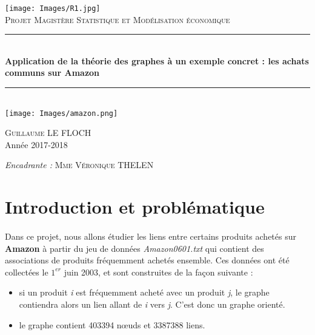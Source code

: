 \documentclass[14pt, openany]{article}
\newcommand{\HRule}{\rule{\linewidth}{0.5mm}}
\begin{document}
\begin{titlepage}
\begin{center}
\texttt{[image: Images/R1.jpg]}\\
\textsc{\Large Projet Magistère Statistique et Modélisation économique}\\
    \HRule \\[0.4cm]
    { \huge \bfseries Application de la théorie des graphes à un exemple concret : les achats communs sur Amazon\\[0.4cm] }
        \HRule \\[2cm]
    \texttt{[image: Images/amazon.png]}
    \\[2cm]
    \begin{minipage}{0.4\textwidth}
      \begin{flushleft} \large
        \textsc{Guillaume LE FLOCH}\\
        Année 2017-2018\\
      \end{flushleft}
    \end{minipage}
    \begin{minipage}{0.4\textwidth}
      \begin{flushright} \large
        \emph{Encadrante : }\textsc{Mme Véronique THELEN}
      \end{flushright}
    \end{minipage}

    \vfill

\end{center}
\end{titlepage}
\tableofcontents

\newpage
\section{Introduction et problématique}
\paragraph{}
Dans ce projet, nous allons étudier les liens entre certains produits achetés sur \textbf{Amazon} à partir du jeu de données \textit{Amazon0601.txt} qui contient des associations de produits fréquemment achetés ensemble. Ces données ont été collectées le $1^{er}$ juin 2003, et sont construites de la façon suivante :
\begin{itemize}
\item si un produit \textit{i} est fréquemment acheté avec un produit \textit{j}, le graphe contiendra alors un lien allant de \textit{i} vers \textit{j}. C'est donc un graphe orienté.
\item le graphe contient 403394 nœuds et 3387388 liens.
\end{itemize}
\end{document}
